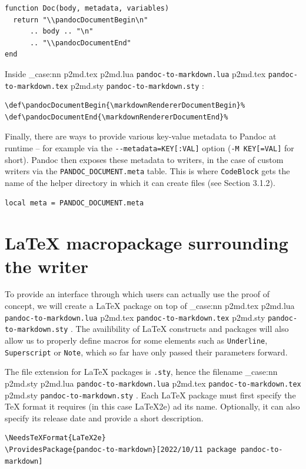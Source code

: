 \documentclass[
  digital,     %
  oneside,     %
  nosansbold,  %
  nocolorbold, %
  lof,         %
  nolot,       %
]{fithesis4}
\newcommand\file[1]
  {
    \str_case:nn
      { #1 }
      {
        { p2md.lua } { \texttt{pandoc\hyp{}to\hyp{}markdown.lua} }
        { p2md.tex } { \texttt{pandoc\hyp{}to\hyp{}markdown.tex} }
        { p2md.sty } { \texttt{pandoc\hyp{}to\hyp{}markdown.sty} }
      }
  }
\begin{document}
\noindent
\lstset{language=[5.3]Lua}
\begin{lstlisting}
function Doc(body, metadata, variables)
  return "\\pandocDocumentBegin\n"
      .. body .. "\n"
      .. "\\pandocDocumentEnd"
end
\end{lstlisting}

\noindent
Inside \file{p2md.tex}:

\noindent
\lstset{language=[plain]TeX}
\begin{lstlisting}
\def\pandocDocumentBegin{\markdownRendererDocumentBegin}%
\def\pandocDocumentEnd{\markdownRendererDocumentEnd}%
\end{lstlisting}

\noindent
Finally, there are ways to provide various key-value metadata to Pandoc at runtime -- for example via the \texttt{-{}-metadata=KEY[:VAL]} option (\texttt{-M KEY[=VAL]} for short). Pandoc then exposes these metadata to writers, in the case of custom writers via the \texttt{PANDOC\_DOCUMENT.meta} table. This is where \texttt{CodeBlock} gets the name of the helper directory in which it can create files (see Section 3.1.2).

\noindent
\lstset{language=[5.3]Lua}
\begin{lstlisting}
local meta = PANDOC_DOCUMENT.meta
\end{lstlisting}

\newpage
\section{\LaTeX{} macropackage surrounding the writer}
To provide an interface through which users can actually use the proof of concept, we will create a \LaTeX{} package on top of \file{p2md.tex}. The availibility of \LaTeX{} constructs and packages will also allow us to properly define macros for some elements such as \texttt{Underline}, \texttt{Superscript} or \texttt{Note}, which so far have only passed their parameters forward.

The file extension for \LaTeX{} packages is \texttt{.sty}, hence the filename \file{p2md.sty}.
Each \LaTeX{} package must first specify the \TeX{} format it requires (in this case \LaTeX{}2e) ad its name. Optionally, it can also specify its release date and provide a short description.

\noindent
\lstset{language=[LaTeX]TeX}
\begin{lstlisting}
\NeedsTeXFormat{LaTeX2e}
\ProvidesPackage{pandoc-to-markdown}[2022/10/11 package pandoc-to-markdown]
\end{lstlisting}
\end{document}
